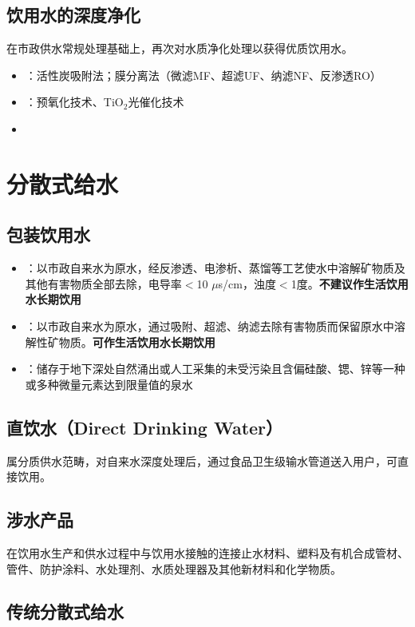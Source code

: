 \subsection{饮用水的深度净化}

在市政供水常规处理基础上，再次对水质净化处理以获得优质饮用水。
\begin{itemize}[leftmargin=*]
    \item {}：活性炭吸附法；膜分离法（微滤MF、超滤UF、纳滤NF、反渗透RO）
    \item {}：预氧化技术、TiO$_2$光催化技术
    \item {}
\end{itemize}

\section{分散式给水}

\subsection{包装饮用水}
\begin{itemize}[leftmargin=*]
    \item {}：以市政自来水为原水，经反渗透、电渗析、蒸馏等工艺使水中溶解矿物质及其他有害物质全部去除，电导率$<$10 $\mu$s/cm，浊度$<$1度。\textbf{不建议作生活饮用水长期饮用}
    \item {}：以市政自来水为原水，通过吸附、超滤、纳滤去除有害物质而保留原水中溶解性矿物质。\textbf{可作生活饮用水长期饮用}
    \item {}：储存于地下深处自然涌出或人工采集的未受污染且含偏硅酸、锶、锌等一种或多种微量元素达到限量值的泉水
\end{itemize}

\subsection{直饮水（Direct Drinking Water）}
属分质供水范畴，对自来水深度处理后，通过食品卫生级输水管道送入用户，可直接饮用。

\subsection{涉水产品}
在饮用水生产和供水过程中与饮用水接触的连接止水材料、塑料及有机合成管材、管件、防护涂料、水处理剂、水质处理器及其他新材料和化学物质。

\subsection{传统分散式给水}

